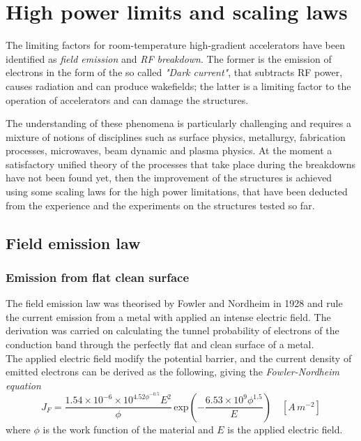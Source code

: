 \section[High power limits and scaling laws]{High power limits and scaling laws}

The limiting factors for room-temperature high-gradient accelerators have been identified as \textit{field emission} and \textit{RF breakdown}. The former is the emission of electrons in the form of the so called \textit{"Dark current"}, that subtracts RF power, causes radiation and can produce wakefields; the latter is a limiting factor to the operation of accelerators and can damage the structures.\cite{Wang:1997ip}

The understanding of these phenomena is particularly challenging and requires a mixture of notions of disciplines such as surface physics, metallurgy, fabrication processes, microwaves, beam dynamic and plasma physics. At the moment a satisfactory unified theory of the processes that take place during the breakdowns have not been found yet, then the improvement of the structures is achieved using some scaling laws for the high power limitations, that have been deducted from the experience and the experiments on the structures tested so far. 


\subsection[Field emission law]{Field emission law}

\subsubsection{Emission from flat clean surface}

The field emission law was theorised by Fowler and Nordheim in 1928 and rule the current emission from a metal with applied an intense electric field. The derivation was carried on calculating the tunnel probability of electrons of the conduction band through the perfectly flat and clean surface of a metal. \\The applied electric field modify the potential barrier, and the current density of emitted electrons can be derived as the following, giving the  \textit{Fowler-Nordheim equation} \cite{Fowler173}
\begin{equation}
J_F = \frac{ 1.54\times10^{-6} \times 10^{4.52\phi^{-0.5}} E^2}{  \phi } \, \text{exp} \left ( -\frac{6.53\times 10^9 \phi^{1.5}}{E} \right ) \quad [A\,m^{-2}]  \label{FNlaw}
\end{equation}
where $\phi$ is the work function of the material and $E$ is the applied electric field.

